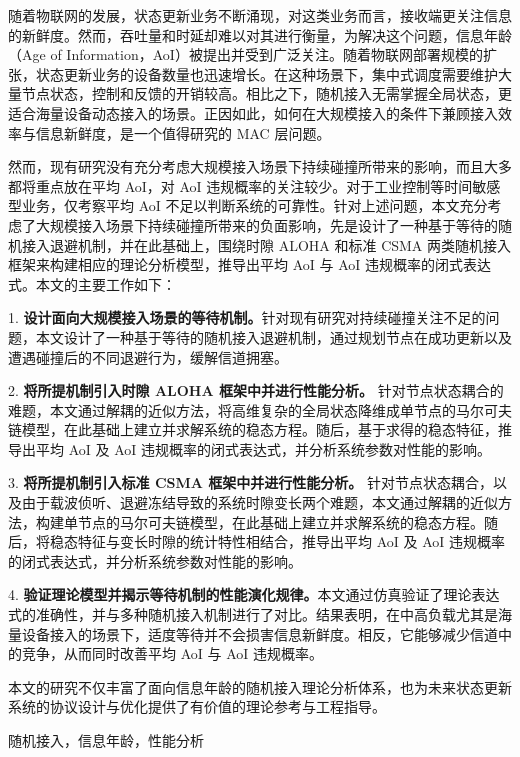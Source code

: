 \begin{abstractCN}
\setlength{\baselineskip}{23pt} %

随着物联网的发展，状态更新业务不断涌现，对这类业务而言，接收端更关注信息的新鲜度。然而，吞吐量和时延却难以对其进行衡量，为解决这个问题，信息年龄（Age of Information，AoI）被提出并受到广泛关注。随着物联网部署规模的扩张，状态更新业务的设备数量也迅速增长。在这种场景下，集中式调度需要维护大量节点状态，控制和反馈的开销较高。相比之下，随机接入无需掌握全局状态，更适合海量设备动态接入的场景。正因如此，如何在大规模接入的条件下兼顾接入效率与信息新鲜度，是一个值得研究的 MAC 层问题。

然而，现有研究没有充分考虑大规模接入场景下持续碰撞所带来的影响，而且大多都将重点放在平均 AoI，对 AoI 违规概率的关注较少。对于工业控制等时间敏感型业务，仅考察平均 AoI 不足以判断系统的可靠性。针对上述问题，本文充分考虑了大规模接入场景下持续碰撞所带来的负面影响，先是设计了一种基于等待的随机接入退避机制，并在此基础上，围绕时隙 ALOHA 和标准 CSMA 两类随机接入框架来构建相应的理论分析模型，推导出平均 AoI 与 AoI 违规概率的闭式表达式。本文的主要工作如下：

1. \textbf{设计面向大规模接入场景的等待机制。}针对现有研究对持续碰撞关注不足的问题，本文设计了一种基于等待的随机接入退避机制，通过规划节点在成功更新以及遭遇碰撞后的不同退避行为，缓解信道拥塞。

2. \textbf{将所提机制引入时隙 ALOHA 框架中并进行性能分析。} 针对节点状态耦合的难题，本文通过解耦的近似方法，将高维复杂的全局状态降维成单节点的马尔可夫链模型，在此基础上建立并求解系统的稳态方程。随后，基于求得的稳态特征，推导出平均 AoI 及 AoI 违规概率的闭式表达式，并分析系统参数对性能的影响。

3. \textbf{将所提机制引入标准 CSMA 框架中并进行性能分析。} 针对节点状态耦合，以及由于载波侦听、退避冻结导致的系统时隙变长两个难题，本文通过解耦的近似方法，构建单节点的马尔可夫链模型，在此基础上建立并求解系统的稳态方程。随后，将稳态特征与变长时隙的统计特性相结合，推导出平均 AoI 及 AoI 违规概率的闭式表达式，并分析系统参数对性能的影响。

4. \textbf{验证理论模型并揭示等待机制的性能演化规律。}本文通过仿真验证了理论表达式的准确性，并与多种随机接入机制进行了对比。结果表明，在中高负载尤其是海量设备接入的场景下，适度等待并不会损害信息新鲜度。相反，它能够减少信道中的竞争，从而同时改善平均 AoI 与 AoI 违规概率。

本文的研究不仅丰富了面向信息年龄的随机接入理论分析体系，也为未来状态更新系统的协议设计与优化提供了有价值的理论参考与工程指导。

\end{abstractCN}
\begin{keywordCN}
随机接入，信息年龄，性能分析
\end{keywordCN}

